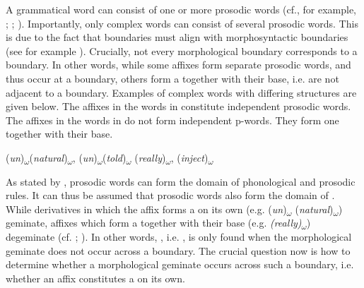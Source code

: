  A grammatical word can consist of one or more prosodic words (cf., for example, \citealt[29]{Booij.1983b}; \citealt[267]{Booij.1985}; \citealt[2]{Hall.2001}). Importantly, only complex words can consist of several prosodic words. This is due to the fact that  boundaries must align with morphosyntactic boundaries (see for example \citealt[2]{Hall.2001}). Crucially, not every morphological boundary corresponds to a  boundary. In other words, while some affixes form separate prosodic words, and thus occur at a  boundary, others form a  together with their base, i.e. are not adjacent to a  boundary. 
Examples of complex words with differing  structures are given below. The affixes in the words in  constitute independent prosodic words. The affixes in the words in  do not form independent p-words. They form one  together with their base. 

\begin{exe}
	\ex\label{ex:4:1} (\textit{un})\textsubscript{$\omega$}(\textit{natural})\textsubscript{$\omega$}, (\textit{un})\textsubscript{$\omega$}(\textit{told})\textsubscript{$\omega$}
	\ex\label{ex:4:2} (\textit{really})\textsubscript{$\omega$}, (\textit{inject})\textsubscript{$\omega$}
\end{exe}\pagebreak


As stated by \citet[3]{Hall.2001}, prosodic words can form the domain of phonological and prosodic rules. It can thus be assumed that prosodic words also form the domain of . While derivatives in which the affix forms a  on its own (e.g. (\textit{un})\textsubscript{$\omega$} (\textit{natural})\textsubscript{$\omega$}) geminate, affixes which form a  together with their base (e.g. \textit{(really)}\textsubscript{$\omega$}) degeminate (cf. \citealt[3543]{Giegerich.2012}; \citealt{Bergmann.}). In other words, , i.e. , is only found when the morphological geminate does not occur across a  boundary. The crucial question now is how to determine whether a morphological geminate occurs across such a boundary, i.e. whether an affix constitutes a  on its own.



